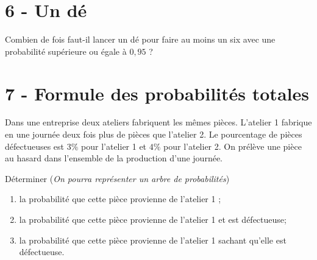 \vspace{1em}

\section*{6 - Un dé}

Combien de fois faut-il lancer un dé pour faire au moins un six avec une probabilité supérieure ou égale à $0{,}95$ ?


\vspace{1em}

\section*{7 - Formule des probabilités totales}
Dans une entreprise deux ateliers fabriquent les mêmes pièces. 
L'atelier 1 fabrique en une journée deux fois plus de pièces que l'atelier 2. 
Le pourcentage de pièces défectueuses est $3 \%$ pour l'atelier 1 et $4 \%$ pour l'atelier 2. 
On prélève une pièce au hasard dans l'ensemble de la production d'une journée. 

Déterminer (\textit{On pourra représenter un arbre de probabilités})
\begin{enumerate}
    \item la probabilité que cette pièce provienne de l'atelier 1 ;

    \item  la probabilité que cette pièce provienne de l'atelier 1 et est défectueuse;

    \item  la probabilité que cette pièce provienne de l'atelier 1 sachant qu'elle est défectueuse.
\end{enumerate}

